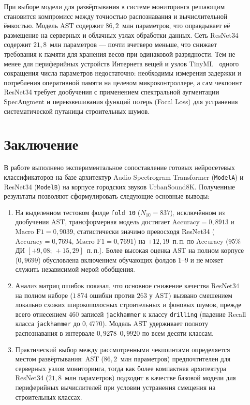 \documentclass[pdflatex,sn-mathphys-num]{sn-jnl}
\begin{document}
При выборе модели для развёртывания в системе мониторинга решающим становится компромисс между точностью распознавания и вычислительной ёмкостью. Модель AST содержит $86{,}2$~млн параметров, что оправдывает её размещение на серверных и облачных узлах обработки данных. Сеть ResNet34 содержит $21{,}8$~млн параметров --- почти вчетверо меньше, что снижает требования к памяти для хранения весов при одинаковой разрядности. Тем не менее для периферийных устройств Интернета вещей и узлов TinyML~\cite{ref9,ref10} одного сокращения числа параметров недостаточно: необходимы измерения задержки и потребления оперативной памяти на целевом микроконтроллере, а сам чекпоинт ResNet34 требует дообучения с применением спектральной аугментации SpecAugment и перевзвешивания функций потерь (Focal Loss) для устранения систематической путаницы строительных шумов.

\section{Заключение}\label{sec:conclusion}

В работе выполнено экспериментальное сопоставление готовых нейросетевых классификаторов на базе архитектур Audio Spectrogram Transformer (\texttt{ModelA}) и ResNet34 (\texttt{ModelB}) на корпусе городских звуков UrbanSound8K. Полученные результаты позволяют сформулировать следующие основные выводы:
\begin{enumerate}
    \item На выделенном тестовом фолде \texttt{fold 10} ($N_{10} = 837$), исключённом из дообучения AST, трансформерная модель достигает $\text{Accuracy} = 0{,}8913$ и $\text{Macro F1} = 0{,}9039$, статистически значимо превосходя ResNet34 ($\text{Accuracy} = 0{,}7694$, $\text{Macro F1} = 0{,}7691$) на $+12{,}19$~п.\,п. по Accuracy (95\% ДИ $[+9{,}08;\, +15{,}29]$~п.\,п.). Более высокая оценка AST на полном корпусе ($0{,}9699$) обусловлена включением обучающих фолдов 1--9 и не может служить независимой мерой обобщения.
    \item Анализ матриц ошибок показал, что основное снижение качества ResNet34 на полном наборе ($1\,874$ ошибки против $263$ у AST) вызвано смешением локально схожих широкополосных строительных и фоновых шумов, прежде всего отнесением 460 записей \texttt{jackhammer} к классу \texttt{drilling} (падение Recall класса \texttt{jackhammer} до $0{,}4770$). Модель AST удерживает полноту распознавания в интервале $0{,}9278$--$0{,}9920$ по всем десяти классам.
    \item Практический выбор между рассмотренными чекпоинтами определяется местом развёртывания: AST ($86{,}2$~млн параметров) предпочтителен для серверных узлов мониторинга, тогда как более компактная архитектура ResNet34 ($21{,}8$~млн параметров) подходит в качестве базовой модели для периферийных вычислителей при условии устранения смещения на строительных классах.
\end{enumerate}
\end{document}

